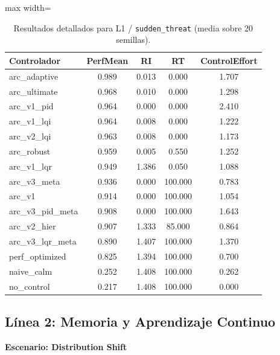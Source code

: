 \documentclass{article}
\newcommand{\scenarioheader}[1]{\Needspace{20\baselineskip}\textbf{Escenario: #1}}
\begin{document}
\begin{table}[H]
\centering
\footnotesize
\caption{Resultados detallados para L1 / \texttt{sudden\_threat} (media sobre 20 semillas).}
\label{tab:g3_sudden_threat}
\begin{adjustbox}{max width=\textwidth}
\begin{tabular}{@{}lcccc@{}}
\toprule
Controlador & PerfMean & RI & RT & ControlEffort \\ \midrule
arc\_adaptive & 0.989 & 0.013 & 0.000 & 1.707 \\
arc\_ultimate & 0.968 & 0.010 & 0.000 & 1.298 \\
arc\_v1\_pid & 0.964 & 0.000 & 0.000 & 2.410 \\
arc\_v1\_lqi & 0.964 & 0.008 & 0.000 & 1.222 \\
arc\_v2\_lqi & 0.963 & 0.008 & 0.000 & 1.173 \\
arc\_robust & 0.959 & 0.005 & 0.550 & 1.252 \\
arc\_v1\_lqr & 0.949 & 1.386 & 0.050 & 1.088 \\
arc\_v3\_meta & 0.936 & 0.000 & 100.000 & 0.783 \\
arc\_v1 & 0.914 & 0.000 & 100.000 & 1.054 \\
arc\_v3\_pid\_meta & 0.908 & 0.000 & 100.000 & 1.643 \\
arc\_v2\_hier & 0.907 & 1.333 & 85.000 & 0.864 \\
arc\_v3\_lqr\_meta & 0.890 & 1.407 & 100.000 & 1.370 \\
perf\_optimized & 0.825 & 1.394 & 100.000 & 0.700 \\
naive\_calm & 0.252 & 1.408 & 100.000 & 0.262 \\
no\_control & 0.217 & 1.408 & 100.000 & 0.000 \\ \bottomrule
\end{tabular}
\end{adjustbox}
\end{table}

\FloatBarrier
\subsection{Línea 2: Memoria y Aprendizaje Continuo}

\scenarioheader{Distribution Shift}
\end{document}
